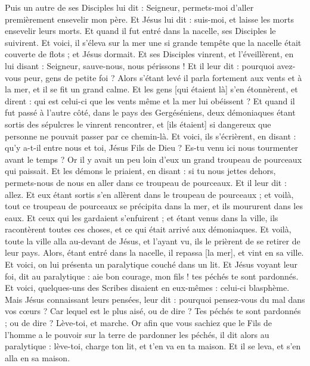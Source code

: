 \begin{multicols}{2}
Puis un autre de ses Disciples lui dit : Seigneur, permets-moi d'aller premièrement ensevelir mon père.
Et Jésus lui dit : suis-moi, et laisse les morts ensevelir leurs morts.
Et quand il fut entré dans la nacelle, ses Disciples le suivirent.
Et voici, il s'éleva sur la mer une si grande tempête que la nacelle était couverte de flots ; et Jésus dormait.
Et ses Disciples vinrent, et l'éveillèrent, en lui disant : Seigneur, sauve-nous, nous périssons !
Et il leur dit : pourquoi avez-vous peur, gens de petite foi ? Alors s'étant levé il parla fortement aux vents et à la mer, et il se fit un grand calme.
Et les gens [qui étaient là] s'en étonnèrent, et dirent : qui est celui-ci que les vents même et la mer lui obéissent ?
Et quand il fut passé à l'autre côté, dans le pays des Gergéséniens, deux démoniaques étant sortis des sépulcres le vinrent rencontrer, et [ils étaient] si dangereux que personne ne pouvait passer par ce chemin-là.
Et voici, ils s'écrièrent, en disant : qu'y a-t-il entre nous et toi, Jésus Fils de Dieu ? Es-tu venu ici nous tourmenter avant le temps ?
Or il y avait un peu loin d'eux un grand troupeau de pourceaux qui paissait.
Et les démons le priaient, en disant : si tu nous jettes dehors, permets-nous de nous en aller dans ce troupeau de pourceaux.
Et il leur dit : allez. Et eux étant sortis s'en allèrent dans le troupeau de pourceaux ; et voilà, tout ce troupeau de pourceaux se précipita dans la mer, et ils moururent dans les eaux.
Et ceux qui les gardaient s'enfuirent ; et étant venus dans la ville, ils racontèrent toutes ces choses, et ce qui était arrivé aux démoniaques.
Et voilà, toute la ville alla au-devant de Jésus, et l'ayant vu, ils le prièrent de se retirer de leur pays.
\VerseOne{}Alors, étant entré dans la nacelle, il repassa [la mer], et vint en sa ville.
Et voici, on lui présenta un paralytique couché dans un lit. Et Jésus voyant leur foi, dit au paralytique : aie bon courage, mon fils ! tes péchés te sont pardonnés.
Et voici, quelques-uns des Scribes disaient en eux-mêmes : celui-ci blasphème.
Mais Jésus connaissant leurs pensées, leur dit : pourquoi pensez-vous du mal dans vos cœurs ?
Car lequel est le plus aisé, ou de dire ? Tes péchés te sont pardonnés ; ou de dire ? Lève-toi, et marche.
Or afin que vous sachiez que le Fils de l'homme a le pouvoir sur la terre de pardonner les péchés, il dit alors au paralytique : lève-toi, charge ton lit, et t'en va en ta maison.
Et il se leva, et s'en alla en sa maison.

\end{multicols}
